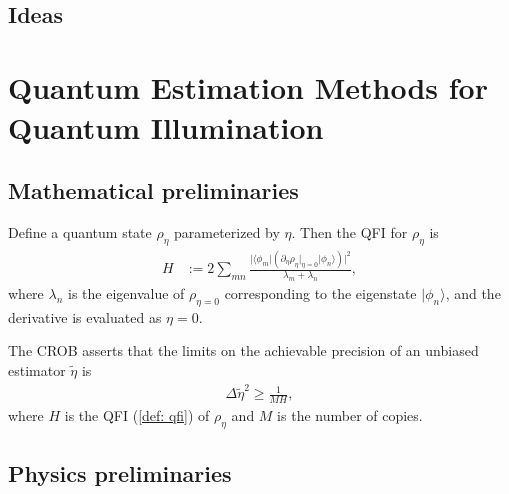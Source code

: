 \documentclass[../../note.tex]{subfiles}
\begin{document}
\begin{lemma}
    \begin{align}
    \end{align}
\end{lemma}

\subsection{Ideas}

\section{Quantum Estimation Methods for Quantum Illumination \cite{sanz2017quantum}}
\subsection{Mathematical preliminaries}
\begin{definition}
    \label{dfe: qfi}
    Define a quantum state $\rho_{\eta}$ parameterized by $\eta$. Then the QFI for $\rho_{\eta}$ is
    \begin{align}
        H
        &:= 2 \sum_{mn} \frac{\vert \langle \phi_m \vert (\partial_{\eta}\rho_{\eta}\vert_{\eta=0}\vert \phi_{n}\rangle)\vert^2}{\lambda_m + \lambda_n},
    \end{align}
    where $\lambda_n$ is the eigenvalue of $\rho_{\eta=0}$ corresponding to the eigenstate $\vert \phi_n \rangle$, and the derivative is evaluated as $\eta=0$.
\end{definition}

\begin{definition}
    \label{def: crob}
    The CROB asserts that the limits on the achievable precision of an unbiased estimator $\tilde{\eta}$ is
    \begin{align}
        \Delta \tilde{\eta}^2 \geq \frac{1}{MH},
    \end{align}
    where $H$ is the QFI (\ref{def: qfi}) of $\rho_{\eta}$ and $M$ is the number of copies. 
\end{definition}

\begin{theorem}
    \label{thm: cct}
    
\end{theorem}

\subsection{Physics preliminaries}
\end{document}
